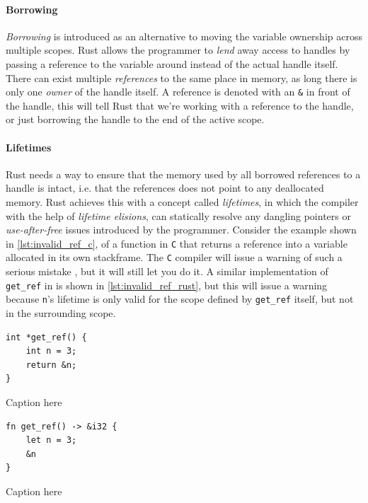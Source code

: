 \paragraph{Borrowing} \hfill

\emph{Borrowing} is introduced as an alternative to moving the variable ownership across multiple
scopes. Rust allows the programmer to \emph{lend} away access to handles by passing a reference to
the variable around instead of the actual handle itself. There can exist multiple \emph{references}
to the same place in memory, as long there is only one \emph{owner} of the handle itself. A
reference is denoted with an \texttt{\&} in front of the handle, this will tell Rust that we're
working with a reference to the handle, or just borrowing the handle to the end of the active scope.


\paragraph{Lifetimes} \hfill

Rust needs a way to ensure that the memory used by all borrowed references to a handle is intact,
i.e. that the references does not point to any deallocated memory. Rust achieves this with a concept
called \emph{lifetimes}, in which  the compiler with the help of \emph{lifetime elisions}, can
statically resolve any dangling pointers or \emph{use-after-free} issues introduced by the
programmer. Consider the example shown in \autoref{lst:invalid_ref_c}, of a function in \texttt{C}
that returns a reference into a variable allocated in its own stackframe. The \texttt{C} compiler
will issue a warning of such a serious mistake , but it will still let
you do it. A similar implementation of \texttt{get\_ref} in \rust is shown in
\autoref{lst:invalid_ref_rust}, but this will issue a warning because \texttt{n}'s lifetime is only
valid for the scope defined by \texttt{get\_ref} itself, but not in the surrounding scope.

\begin{listing}[tb]
\begin{verbatim}
int *get_ref() {
    int n = 3;
    return &n;
}
\end{verbatim}
\caption{Caption here}
\label{lst:invalid_ref_c}
\end{listing}

\begin{listing}[tb]
\begin{verbatim}
fn get_ref() -> &i32 {
    let n = 3;
    &n
}
\end{verbatim}
\caption{Caption here}
\label{lst:invalid_ref_rust}
\end{listing}

